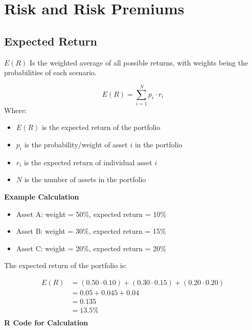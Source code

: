 \documentclass[
]{book}
\providecommand{\tightlist}{%
  \setlength{\itemsep}{0pt}\setlength{\parskip}{0pt}}
\begin{document}
\hypertarget{risk-and-risk-premiums}{%
\section{Risk and Risk Premiums}\label{risk-and-risk-premiums}}

\hypertarget{expected-return}{%
\subsection{Expected Return}\label{expected-return}}

\(E(R)\) Is the weighted average of all possible returns, with weights being the probabilities of each scenario.

\[
E(R) = \sum_{i=1}^{N} p_i \cdot r_i
\]
Where:

\begin{itemize}
\tightlist
\item
  \(E(R)\) is the expected return of the portfolio
\item
  \(p_i\) is the probability/weight of asset \(i\) in the portfolio
\item
  \(r_i\) is the expected return of individual asset \(i\)
\item
  \(N\) is the number of assets in the portfolio
\end{itemize}

\textbf{Example Calculation}

\begin{itemize}
\tightlist
\item
  Asset A: weight = 50\%, expected return = 10\%
\item
  Asset B: weight = 30\%, expected return = 15\%
\item
  Asset C: weight = 20\%, expected return = 20\%
\end{itemize}

The expected return of the portfolio is:

\[
\begin{aligned}
E(R) &= (0.50 \cdot 0.10) + (0.30 \cdot 0.15) + (0.20 \cdot 0.20) \\
       &= 0.05 + 0.045 + 0.04 \\
       &= 0.135 \\
       &= 13.5\% \\  
\end{aligned}
\]
\textbf{R Code for Calculation}
\end{document}

